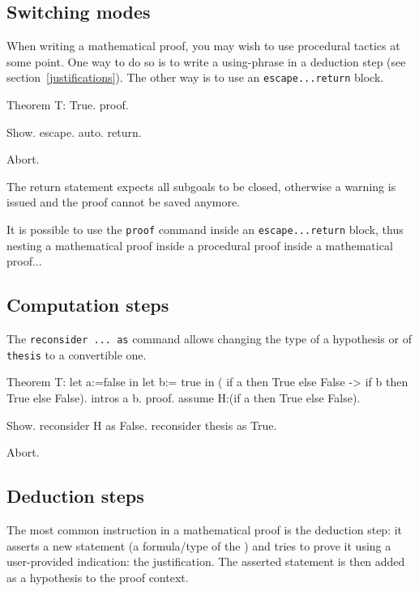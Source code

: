 \subsection{Switching modes}

When writing a mathematical proof, you may wish to use procedural
tactics at some point. One way to do so is to write a using-{}phrase
in a deduction step (see section~\ref{justifications}). The other way
is to use an {\texttt{escape...return}} block.

\begin{coq_eval}  
Theorem T: True.
proof.
\end{coq_eval}
\begin{coq_example}
 Show.
 escape.
 auto.
 return.
\end{coq_example}
\begin{coq_eval}
Abort.
\end{coq_eval}

The return statement expects all subgoals to be closed, otherwise a
warning is issued and the proof cannot be saved anymore.

It is possible to use the {\texttt{proof}} command inside an
{\texttt{escape...return}} block, thus nesting a mathematical proof
inside a procedural proof inside a mathematical proof...

\subsection{Computation steps}

The {\tt reconsider ... as} command allows changing the type of a hypothesis or of {\tt thesis} to a convertible one.

\begin{coq_eval}
Theorem T: let a:=false in let b:= true in ( if a then True else False -> if b then True else False).
intros a b.
proof.
assume H:(if a then True else False).
\end{coq_eval}
\begin{coq_example}
 Show.
 reconsider H as False.
 reconsider thesis as True.
\end{coq_example}
\begin{coq_eval}
Abort.
\end{coq_eval}


\subsection{Deduction steps}

The most common instruction in a mathematical proof is the deduction
step: it asserts a new statement (a formula/type of the \CIC) and tries
to prove it using a user-provided indication: the justification. The
asserted statement is then added as a hypothesis to the proof context.


